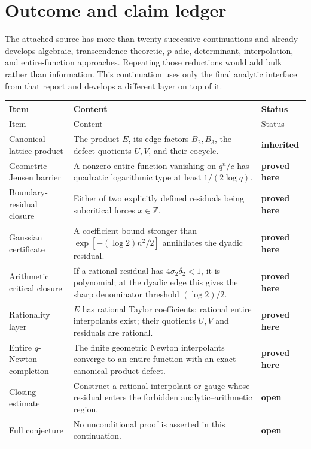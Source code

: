 \documentclass[11pt]{article}
\theoremstyle{definition}
\newcommand{\Z}{\mathbb Z}
\newcommand{\statusproved}{\textcolor{provedgreen}{\textbf{proved here}}}
\newcommand{\statusinherited}{\textcolor{linkblue}{\textbf{inherited}}}
\newcommand{\statusopen}{\textcolor{openred}{\textbf{open}}}
\begin{document}
\tableofcontents
\newpage

\section{Outcome and claim ledger}

The attached source has more than twenty successive continuations and already develops algebraic, transcendence-theoretic, \(p\)-adic, determinant, interpolation, and entire-function approaches.  Repeating those reductions would add bulk rather than information.  This continuation uses only the final analytic interface from that report and develops a different layer on top of it.

\begin{longtable}{>{\raggedright\arraybackslash}p{} >{\raggedright\arraybackslash}p{} >{\raggedright\arraybackslash}p{}}
\toprule
Item & Content & Status\\
\midrule
\endfirsthead
\toprule
Item & Content & Status\\
\midrule
\endhead
Canonical lattice product & The product \(E\), its edge factors \(B_2,B_3\), the defect quotients \(U,V\), and their cocycle. & \statusinherited\\
Geometric Jensen barrier & A nonzero entire function vanishing on \(q^n/c\) has quadratic logarithmic type at least \(1/(2\log q)\). & \statusproved\\
Boundary-residual closure & Either of two explicitly defined residuals being subcritical forces \(x\in\Z\). & \statusproved\\
Gaussian certificate & A coefficient bound stronger than \(\exp[-(\log 2)n^2/2]\) annihilates the dyadic residual. & \statusproved\\
Arithmetic critical closure & If a rational residual has \(4\sigma_2\delta_2<1\), it is polynomial; at the dyadic edge this gives the sharp denominator threshold \((\log 2)/2\). & \statusproved\\
Rationality layer & \(E\) has rational Taylor coefficients; rational entire interpolants exist; their quotients \(U,V\) and residuals are rational. & \statusproved\\
Entire \(q\)-Newton completion & The finite geometric Newton interpolants converge to an entire function with an exact canonical-product defect. & \statusproved\\
Closing estimate & Construct a rational interpolant or gauge whose residual enters the forbidden analytic--arithmetic region. & \statusopen\\
Full conjecture & No unconditional proof is asserted in this continuation. & \statusopen\\
\bottomrule
\end{longtable}
\end{document}
